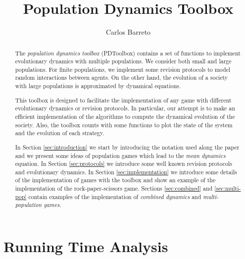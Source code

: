\documentclass[a4paper,10pt]{article}
\title{Population Dynamics Toolbox}
\author{Carlos Barreto}
\begin{document}
\lstset{language=Matlab} 
\maketitle



\begin{abstract}
 The \emph{population dynamics toolbox} (PDToolbox) contains a set of functions to implement evolutionary dynamics with multiple populations. We consider both small and large populations. For finite populations, we implement some revision protocols to model random interactions between agents. On the other hand, the evolution of a society with large populations is approximated by dynamical equations. 
 
 This toolbox is designed to facilitate the implementation of any game with different evolutionary dynamics or revision protocols.  In particular, our attempt is to make an efficient implementation of the algorithms to compute the dynamical evolution of the society. Also, the toolbox counts with some functions to plot the state of the system and the evolution of each strategy.
 
 In Section \ref{sec:introduction} we start by introducing the notation used along the paper and we present some ideas of population games which lead to the \emph{mean dynamics} equation. In Section \ref{sec:protocols} we introduce some well known revision protocols and evolutionary dynamics. In Section \ref{sec:implementation} we introduce some details of the implementation of games with the toolbox and show an example of the implementation of the rock-paper-scissors game.
 Sections \ref{sec:combined} and \ref{sec:multi-pop} contain examples of the implementation of \emph{combined dynamics} and \emph{multi-population games}.
 
\end{abstract}


\tableofcontents




 
 

 











 \FloatBarrier
\section{Running Time Analysis}\label{sec:running_time}
\end{document}
